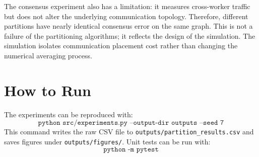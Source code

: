 \documentclass[11pt]{article}
\begin{document}
The consensus experiment also has a limitation: it measures cross-worker
traffic but does not alter the underlying communication topology. Therefore,
different partitions have nearly identical consensus error on the same graph.
This is not a failure of the partitioning algorithms; it reflects the design of
the simulation. The simulation isolates communication placement cost rather
than changing the numerical averaging process.

\section{How to Run}

The experiments can be reproduced with:
\[
\texttt{python src/experiments.py --output-dir outputs --seed 7}
\]
This command writes the raw CSV file to
\texttt{outputs/partition\_results.csv} and saves figures under
\texttt{outputs/figures/}. Unit tests can be run with:
\[
\texttt{python -m pytest}
\]
\end{document}
